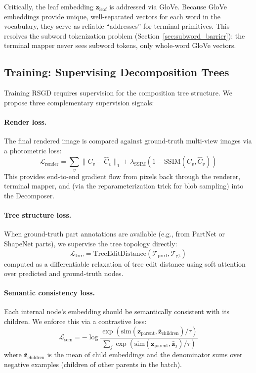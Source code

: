 \documentclass[11pt]{article}
\begin{document}
Critically, the leaf embedding $\mathbf{z}_{\text{leaf}}$ is addressed via GloVe. Because GloVe embeddings provide unique, well-separated vectors for each word in the vocabulary, they serve as reliable ``addresses'' for terminal primitives. This resolves the subword tokenization problem (Section~\ref{sec:subword_barrier}): the terminal mapper never sees subword tokens, only whole-word GloVe vectors.

\subsection{Training: Supervising Decomposition Trees}

Training RSGD requires supervision for the composition tree structure. We propose three complementary supervision signals:

\paragraph{Render loss.} The final rendered image is compared against ground-truth multi-view images via a photometric loss:
\begin{equation}
\mathcal{L}_{\text{render}} = \sum_v \| C_v - \hat{C}_v \|_1 + \lambda_{\text{SSIM}} (1 - \text{SSIM}(C_v, \hat{C}_v))
\end{equation}
This provides end-to-end gradient flow from pixels back through the renderer, terminal mapper, and (via the reparameterization trick for blob sampling) into the Decomposer.

\paragraph{Tree structure loss.} When ground-truth part annotations are available (e.g., from PartNet \cite{mo2019} or ShapeNet parts), we supervise the tree topology directly:
\begin{equation}
\mathcal{L}_{\text{tree}} = \text{TreeEditDistance}(\mathcal{T}_{\text{pred}}, \mathcal{T}_{\text{gt}})
\end{equation}
computed as a differentiable relaxation of tree edit distance using soft attention over predicted and ground-truth nodes.

\paragraph{Semantic consistency loss.} Each internal node's embedding should be semantically consistent with its children. We enforce this via a contrastive loss:
\begin{equation}
\mathcal{L}_{\text{sem}} = -\log \frac{\exp(\text{sim}(\mathbf{z}_{\text{parent}}, \bar{\mathbf{z}}_{\text{children}})/\tau)}{\sum_j \exp(\text{sim}(\mathbf{z}_{\text{parent}}, \bar{\mathbf{z}}_j)/\tau)}
\end{equation}
where $\bar{\mathbf{z}}_{\text{children}}$ is the mean of child embeddings and the denominator sums over negative examples (children of other parents in the batch).
\end{document}
